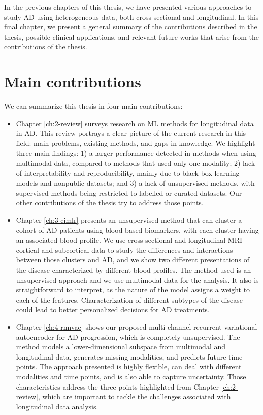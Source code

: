 In the previous chapters of this thesis, we have presented various approaches to study AD using heterogeneous data, both cross-sectional and longitudinal. In this final chapter, we present a general summary of the contributions described in the thesis, possible clinical applications, and relevant future works that arise from the contributions of the thesis.

\section{Main contributions}

We can summarize this thesis in four main contributions:

\begin{itemize}
\item Chapter \ref{ch:2-review} surveys research on ML methods for longitudinal data in AD. This review portrays a clear picture of the current research in this field: main problems, existing methods, and gaps in knowledge. We highlight three main findings: 1) a larger performance detected in methods when using multimodal data, compared to methods that used only one modality; 2) lack of interpretability and reproducibility, mainly due to black-box learning models and nonpublic datasets; and 3) a lack of unsupervised methods, with supervised methods being restricted to labelled or curated datasets. Our other contributions of the thesis try to address those points.

\item Chapter \ref{ch:3-cimlr} presents an unsupervised method that can cluster a cohort of AD patients using blood-based biomarkers, with each cluster having an associated blood profile. We use cross-sectional and longitudinal MRI cortical and subcortical data to study the differences and interactions between those clusters and AD, and we show two different presentations of the disease characterized by different blood profiles. The method used is an unsupervised approach and we use multimodal data for the analysis. It also is straightforward to interpret, as the nature of the model assigns a weight to each of the features. Characterization of different subtypes of the disease could lead to better personalized decisions for AD treatments.

\item Chapter \ref{ch:4-rnnvae} shows our proposed multi-channel recurrent variational autoencoder for AD progression, which is completely unsupervised. The method models a lower-dimensional subspace from multimodal and longitudinal data, generates missing modalities, and predicts future time points. The approach presented is highly flexible, can deal with different modalities and time points, and is also able to capture uncertainty. Those characteristics address the three points highlighted from Chapter \ref{ch:2-review}, which are important to tackle the challenges associated with longitudinal data analysis.


\end{itemize}
